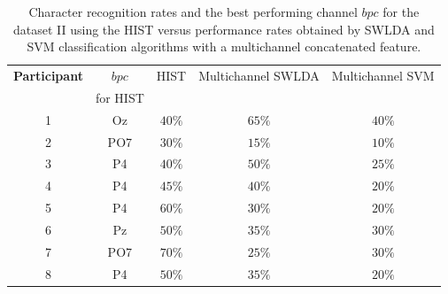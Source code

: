 \begin{table}[h!]
\caption[Dataset II - Comparisons of Character Recognition Rates]{Character recognition rates and the best performing channel $bpc$ for the  dataset II  using the HIST versus performance rates obtained by SWLDA and SVM classification algorithms with a multichannel concatenated feature.}
\centering
\begin{tabular}{c|cc|c|c}
\toprule
\textbf{Participant}	&  $bpc$ 	&  HIST & Multichannel SWLDA & Multichannel SVM  \\
                                    &  for HIST        &           &                                       &   \\
\midrule
1     &     Oz   &     $40\%$  &     $65\%$  &     $40\%$ \\
2     &     PO7   &     $30\%$ &   $15\%$  &     $10\%$ \\
3     &     P4   &     $40\%$ &     $50\%$  &     $25\%$ \\
4     &     P4   &     $45\%$ &     $40\%$  &     $20\%$ \\
5     &     P4   &      $60\%$ &    $30\%$  &     $20\%$ \\
6     &     Pz   &      $50\%$ &    $35\%$  &     $30\%$ \\
7     &     PO7   &      $70\%$ &  $25\%$  &     $30\%$ \\
8     &     P4   &      $50\%$ &    $35\%$  &     $20\%$ \\

\end{tabular}
\label{tab:resultsownswlda}
\end{table}

 

